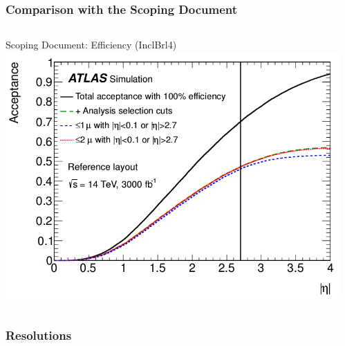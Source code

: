 \documentclass{beamer}
\begin{document}

\begin{frame}[t]
\frametitle{Comparison with the Scoping Document}
\begin{columns}
\begin{column}{.6\textwidth}
\centering
Scoping Document: Efficiency (InclBrl4)
\includegraphics[width=\textwidth]{scopingAcceptance}
\end{column}
\begin{column}{.4\textwidth}
\end{column}
\end{columns}

\medskip
\begin{center}
\end{center}
\end{frame}


\begin{frame}
\frametitle{Resolutions}
\end{frame}

\end{document}
